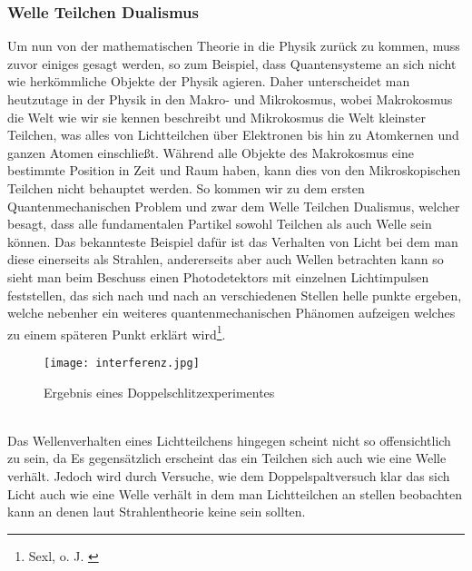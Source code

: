 \documentclass[12pt]{report}
\begin{document}
	\subsubsection{Welle Teilchen Dualismus}
Um nun von der mathematischen Theorie in die Physik zurück zu kommen, muss zuvor einiges gesagt werden, so zum Beispiel, dass Quantensysteme an sich nicht wie herkömmliche Objekte der Physik agieren. Daher unterscheidet man heutzutage in der Physik in den Makro- und Mikrokosmus, wobei Makrokosmus die Welt wie wir sie kennen beschreibt und Mikrokosmus die Welt kleinster Teilchen, was alles von Lichtteilchen über Elektronen bis hin zu Atomkernen und ganzen Atomen einschließt. Während alle Objekte des Makrokosmus eine bestimmte Position in Zeit und Raum haben, kann dies von den Mikroskopischen Teilchen nicht behauptet werden. So kommen wir zu dem ersten Quantenmechanischen Problem und zwar dem Welle Teilchen Dualismus, welcher besagt, dass alle fundamentalen Partikel sowohl Teilchen als auch Welle sein können. Das bekannteste Beispiel dafür ist das Verhalten von Licht bei dem man diese einerseits als Strahlen, andererseits aber auch Wellen betrachten kann so sieht man beim Beschuss einen Photodetektors mit einzelnen Lichtimpulsen feststellen, das sich nach und nach an verschiedenen Stellen helle punkte ergeben, welche nebenher ein weiteres quantenmechanischen Phänomen aufzeigen welches zu einem späteren Punkt erklärt wird\footnote{Sexl, o. J. \cite{a222-1}}.
\begin{figure}[h]
\centering
	\texttt{[image: interferenz.jpg]}
 	 \caption{
 	 Ergebnis eines Doppelschlitzexperimentes
 	 }
\end{figure}\\

 Das Wellenverhalten eines Lichtteilchens hingegen scheint nicht so offensichtlich zu sein, da Es gegensätzlich erscheint das ein Teilchen sich auch wie eine Welle verhält. Jedoch wird durch Versuche, wie dem Doppelspaltversuch klar das sich Licht auch wie eine Welle verhält in dem man Lichtteilchen an stellen beobachten kann an denen laut Strahlentheorie keine sein sollten.
 
\end{document}
